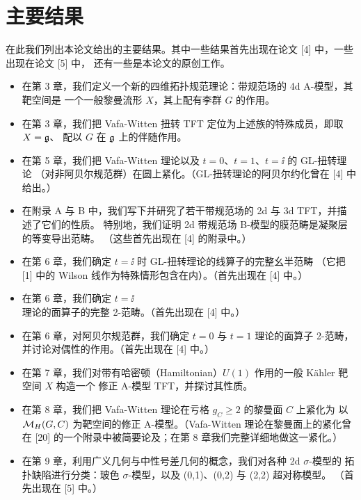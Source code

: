 

\section{主要结果}

在此我们列出本论文给出的主要结果。其中一些结果首先出现在论文 [4] 中，一些出现在论文 [5] 中，
还有一些是本论文的原创工作。
\begin{itemize}[leftmargin=1.8em,itemsep=3pt,topsep=3pt]
\item 在第 3 章，我们定义一个新的四维拓扑规范理论：带规范场的 4d A-模型，其靶空间是
  一个一般黎曼流形 $X$，其上配有李群 $G$ 的作用。
\item 在第 3 章，我们把 Vafa-Witten 扭转 TFT 定位为上述族的特殊成员，即取 $X=\mathfrak{g}$、
  配以 $G$ 在 $\mathfrak{g}$ 上的伴随作用。
\item 在第 5 章，我们把 Vafa-Witten 理论以及 $t=0$、$t=1$、$t=\ii$ 的 GL-扭转理论
  （对非阿贝尔规范群）在圆上紧化。（GL-扭转理论的阿贝尔约化曾在 [4] 中给出。）
\item 在附录 A 与 B 中，我们写下并研究了若干带规范场的 2d 与 3d TFT，并描述了它们的性质。
  特别地，我们证明 2d 带规范场 B-模型的膜范畴是凝聚层的等变导出范畴。
  （这些首先出现在 [4] 的附录中。）
\item 在第 6 章，我们确定 $t=\ii$ 时 GL-扭转理论的线算子的完整幺半范畴
  （它把 [1] 中的 Wilson 线作为特殊情形包含在内）。（首先出现在 [4] 中。）
\item 在第 6 章，我们确定 $t=\ii$ 理论的面算子的完整 2-范畴。（首先出现在 [4] 中。）
\item 在第 6 章，对阿贝尔规范群，我们确定 $t=0$ 与 $t=1$ 理论的面算子 2-范畴，
  并讨论对偶性的作用。（首先出现在 [4] 中。）
\item 在第 7 章，我们对带有哈密顿（Hamiltonian）$U(1)$ 作用的一般 Kähler 靶空间 $X$ 构造一个
  修正 A-模型 TFT，并探讨其性质。
\item 在第 8 章，我们把 Vafa-Witten 理论在亏格 $g_C\ge 2$ 的黎曼面 $C$ 上紧化为
  以 $\mathcal{M}_H(G,C)$ 为靶空间的修正 A-模型。（Vafa-Witten 理论在黎曼面上的紧化曾在 [20]
  的一个附录中被简要论及；在第 8 章我们完整详细地做这一紧化。）
\item 在第 9 章，利用广义几何与中性号差几何的概念，我们对各种 2d $\sigma$-模型的
  拓扑缺陷进行分类：玻色 $\sigma$-模型，以及 (0,1)、(0,2) 与 (2,2) 超对称模型。
  （首先出现在 [5] 中。）
\end{itemize}



